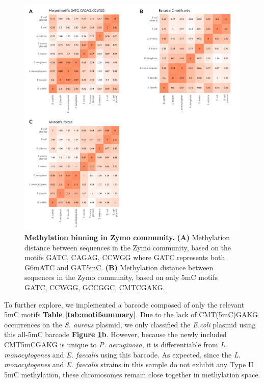 \begin{figure}[!hb]
\centering
\includegraphics[width = 1\linewidth,keepaspectratio]{figure/zheatmaps.pdf}
\caption[Methylation binning in Zymo community]{{\bf Methylation binning in Zymo community.} {\bf (A)} Methylation distance between sequences in the Zymo community, based on the motifs GATC, CAGAG, CCWGG where GATC represents both G6mATC and GAT5mC. {\bf (B)} Methylation distance between sequences in the Zymo community, based on only 5mC motifs GATC, CCWGG, GCCGGC, CMTCGAKG. }
\label{fig:zheatmaps}
\end{figure}


To further explore, we implemented a barcode composed of only the relevant 5mC motifs {\bf Table \ref{tab:motifsummary}}. Due to the lack of CMT(5mC)GAKG occurrences on the \textit{S. aureus} plasmid, we only classified the \textit{E.coli} plasmid using this all-5mC barcode {\bf Figure \ref{fig:zheatmaps}b}. However, because the newly included CMT5mCGAKG is unique to \textit{P. aeruginosa}, it is differentiable from \textit{L. monocytogenes} and \textit{E. faecalis} using this barcode. As expected, since the \textit{L. monocytogenes} and \textit{E. faecalis} strains in this sample do not exhibit any Type II 5mC methylation, these chromosomes remain close together in methylation space.

